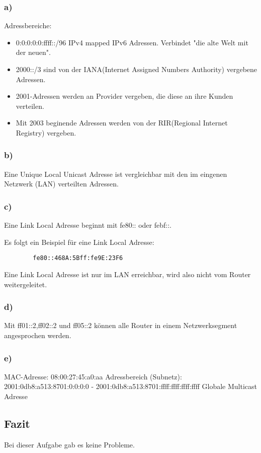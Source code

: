 \subsubsection{a)}
Adressbereiche:
\begin{itemize}
\item 0:0:0:0:0:ffff::/96 IPv4 mapped IPv6 Adressen. Verbindet "die alte Welt mit der neuen".
\item 2000::/3 sind von der IANA(Internet Assigned Numbers Authority) vergebene Adressen.
\item 2001-Adressen werden an Provider vergeben, die diese an ihre Kunden verteilen.
\item Mit 2003 beginende Adressen werden von der RIR(Regional Internet Registry) vergeben.
\end{itemize}

\subsubsection{b)}
Eine Unique Local Unicast Adresse ist vergleichbar mit den im eingenen Netzwerk (LAN) verteilten Adressen.

\subsubsection{c)}
Eine Link Local Adresse beginnt mit fe80:: oder febf::.

Es folgt ein Beispiel für eine Link Local Adresse:
\begin{lstlisting}
		fe80::468A:5Bff:fe9E:23F6
\end{lstlisting}

Eine Link Local Adresse ist nur im LAN erreichbar, wird also nicht vom Router weitergeleitet.

\subsubsection{d)}
Mit ff01::2,ff02::2 und ff05::2 können alle Router in einem Netzwerksegment angesprochen werden.

\subsubsection{e)}
MAC-Adresse: 08:00:27:45:a0:aa
Adressbereich (Subnetz): 2001:0db8:a513:8701:0:0:0:0 - 2001:0db8:a513:8701:ffff:ffff:ffff:ffff
Globale Multicast Adresse

\subsection{Fazit}
Bei dieser Aufgabe gab es keine Probleme.
